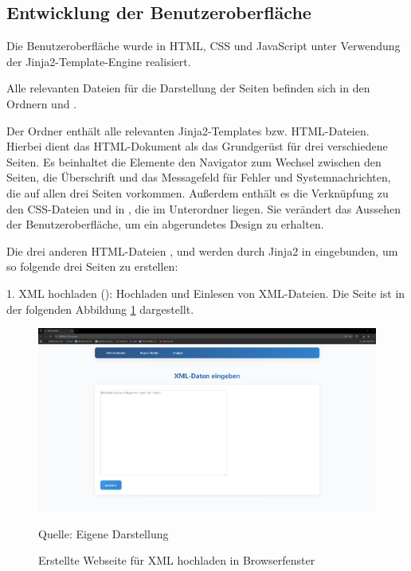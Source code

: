 \subsection{Entwicklung der Benutzeroberfläche}
\label{subsec:entwicklung-der-benutzeroberflache}

Die Benutzeroberfläche wurde in HTML, CSS und JavaScript unter Verwendung der Jinja2-Template-Engine realisiert.

Alle relevanten Dateien für die Darstellung der Seiten befinden sich in den Ordnern  und .

Der Ordner  enthält alle relevanten Jinja2-Templates bzw. HTML-Dateien.
Hierbei dient das HTML-Dokument  als das Grundgerüst für drei verschiedene Seiten.
Es beinhaltet die Elemente den Navigator zum Wechsel zwischen den Seiten, die Überschrift und das Messagefeld für Fehler und Systemnachrichten, die auf allen drei Seiten vorkommen.
Außerdem enthält es die Verknüpfung zu den CSS-Dateien  und  in , die im Unterordner  liegen.
Sie verändert das Aussehen der Benutzeroberfläche, um ein abgerundetes Design zu erhalten.

Die drei anderen HTML-Dateien ,  und  werden durch Jinja2 in  eingebunden, um so folgende drei Seiten zu erstellen:

1. XML hochladen (): Hochladen und Einlesen von XML-Dateien.
Die Seite ist in der folgenden Abbildung \ref{fig: Webseite für XML hochladen} dargestellt.

\begin{figure}[H]
    \centering
    \includegraphics[width=1\textwidth]{Grafiken/Bild XML hochladen}
    \caption{Erstellte Webseite für XML hochladen in Browserfenster}
    \label{fig: Webseite für XML hochladen}
    {Quelle: Eigene Darstellung}
\end{figure}

